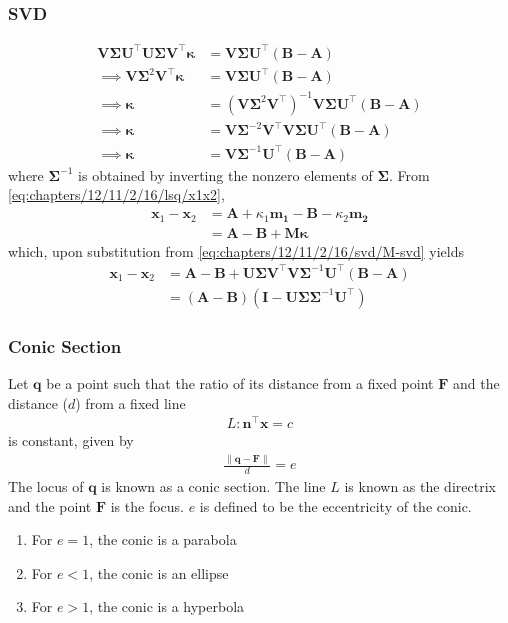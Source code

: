 \documentclass{beamer}
\providecommand{\brak}[1]{\ensuremath{\left(#1\right)}}
\theoremstyle{remark}
\providecommand{\norm}[1]{\lVert#1\rVert}
\let\vec\mathbf
\begin{document}
\begin{frame}
\frametitle{SVD}
	\begin{align}
\vec{V}\vec{\Sigma}\vec{U}^\top\vec{U}\vec{\Sigma}\vec{V}^\top\bm{\kappa} &= \vec{V}\vec{\Sigma}\vec{U}^\top\brak{\vec{B}-\vec{A}} \\
\implies \vec{V}\vec{\Sigma}^2\vec{V}^\top\bm{\kappa} &= \vec{V}\vec{\Sigma}\vec{U}^\top\brak{\vec{B}-\vec{A}} \\
\implies \bm{\kappa} &= \brak{\vec{V}\vec{\Sigma}^2\vec{V}^\top}^{-1}\vec{V}\vec{\Sigma}\vec{U}^\top\brak{\vec{B}-\vec{A}} \\
\implies \bm{\kappa} &= \vec{V}\vec{\Sigma}^{-2}\vec{V}^\top\vec{V}\vec{\Sigma}\vec{U}^\top\brak{\vec{B}-\vec{A}} \\
\implies \bm{\kappa} &= \vec{V}\vec{\Sigma}^{-1}\vec{U}^\top\brak{\vec{B}-\vec{A}}
\label{eq:chapters/12/11/2/16/svd/kappa-sol}
\end{align}
    where $\vec{\Sigma}^{-1}$ is obtained by inverting the nonzero elements of
    $\vec{\Sigma}$. 
	    From \eqref{eq:chapters/12/11/2/16/lsq/x1x2}, 
\begin{align}
	\vec{x}_1-\vec{x}_2 &= 
	\vec{A}+ \kappa_1\vec{m_1}
	 -\vec{B}  - \kappa_2\vec{m_2} 
	 \\
	 &=
	\vec{A} 
	 -\vec{B}  + \vec{M} 
	\bm{\kappa}
\end{align}
which, upon substitution from 
        \eqref{eq:chapters/12/11/2/16/svd/M-svd}
	yields
\begin{align}
	\vec{x}_1-\vec{x}_2 &= 
	\vec{A} 
	 -\vec{B}  + 
\vec{U}\vec{\Sigma}\vec{V}^\top
\vec{V}\vec{\Sigma}^{-1}\vec{U}^\top\brak{\vec{B}-\vec{A}}
\\
	&=
	\brak{	\vec{A} 
	 -\vec{B}}  \brak{\vec{I}- 
\vec{U}\vec{\Sigma}
	\vec{\Sigma}^{-1}\vec{U}^\top}
\end{align}
\end{frame}
\begin{frame}
\frametitle{Conic Section}
  Let $\vec{q}$ be a point such that the ratio of its distance from a fixed point $\vec{F}$ and the distance ($d$) from a fixed line 
	\begin{align}
L: \vec{n}^{\top}\vec{x}=c 
	\end{align}
		is constant, given by 
\label{conics/30/def}
\begin{align}
\frac{\norm{\vec{q}-\vec{F}}}{d} = e    
\end{align}
The locus of $\vec{q}$ is known as a conic section. The line $L$ is known as the directrix and the point $\vec{F}$ is the focus. $e$ is defined to be 
the eccentricity of the conic.  
\begin{enumerate}
\item For $e = 1$, the conic is a parabola
    \item For $e < 1$, the conic is an ellipse
    \item For $e > 1$, the conic is a hyperbola
\end{enumerate}
\end{frame}
\end{document}
